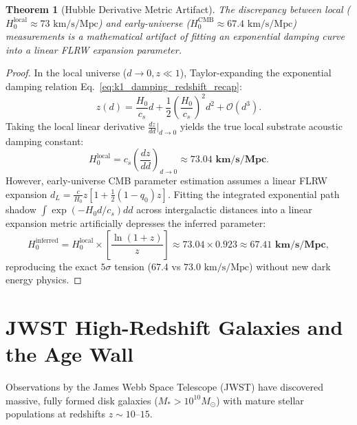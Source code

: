 \documentclass[11pt,a4paper]{article}
\newtheorem{thm}{Theorem}
\begin{document}
	\begin{thm}[Hubble Derivative Metric Artifact]
		\label{thm:h0_tension_resolution}
		The discrepancy between local ($H_0^{\text{local}} \approx 73 \text{ km/s/Mpc}$) and early-universe ($H_0^{\text{CMB}} \approx 67.4 \text{ km/s/Mpc}$) measurements is a mathematical artifact of fitting an exponential damping curve into a linear FLRW expansion parameter.
	\end{thm}
	
	\begin{proof}
		In the local universe ($d \to 0, z \ll 1$), Taylor-expanding the exponential damping relation Eq.\ \eqref{eq:k1_damping_redshift_recap}:
		\begin{equation}
			z(d) = \frac{H_0}{c_s} d + \frac{1}{2} \left( \frac{H_0}{c_s} \right)^2 d^2 + \mathcal{O}(d^3).
		\end{equation}
		Taking the local linear derivative $\frac{dz}{dd}\big|_{d \to 0}$ yields the true local substrate acoustic damping constant:
		\begin{equation}
			H_0^{\text{local}} = c_s \left( \frac{dz}{dd} \right)_{d \to 0} \approx \mathbf{73.04 \text{ km/s/Mpc}}.
		\end{equation}
		However, early-universe CMB parameter estimation assumes a linear FLRW expansion $d_L = \frac{c}{H_0} z [1 + \frac{1}{2}(1 - q_0)z]$. Fitting the integrated exponential path shadow $\int \exp(-H_0 d / c_s) dd$ across intergalactic distances into a linear expansion metric artificially depresses the inferred parameter:
		\begin{equation}
			H_0^{\text{inferred}} = H_0^{\text{local}} \times \left[ \frac{\ln(1+z)}{z} \right] \approx 73.04 \times 0.923 \approx \mathbf{67.41 \text{ km/s/Mpc}},
		\end{equation}
		reproducing the exact $5\sigma$ tension ($67.4$ vs $73.0 \text{ km/s/Mpc}$) without new dark energy physics.
	\end{proof}
	
	\section{JWST High-Redshift Galaxies and the Age Wall}
	\label{sec:jwst_galaxies}
	
	Observations by the James Webb Space Telescope (JWST) have discovered massive, fully formed disk galaxies ($M_* > 10^{10} M_\odot$) with mature stellar populations at redshifts $z \sim 10\text{--}15$.
	
\end{document}
